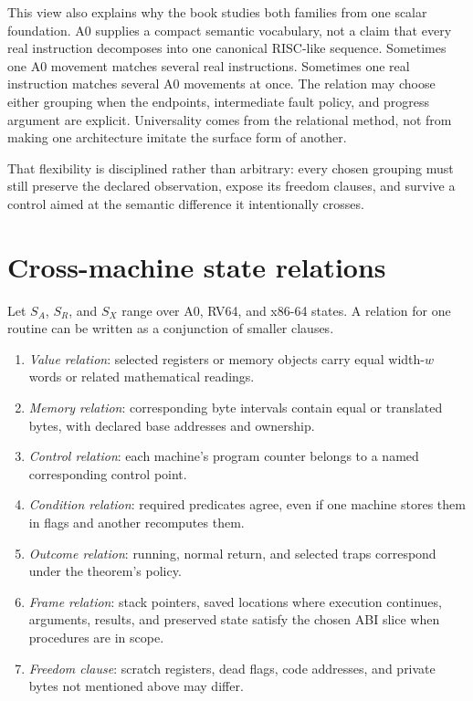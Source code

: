 This view also explains why the book studies both families from one scalar
foundation. A0 supplies a compact semantic vocabulary, not a claim that every
real instruction decomposes into one canonical RISC-like sequence. Sometimes
one A0 movement matches several real instructions. Sometimes one real
instruction matches several A0 movements at once. The relation may choose
either grouping when the endpoints, intermediate fault policy, and progress
argument are explicit. Universality comes from the relational method, not from
making one architecture imitate the surface form of another.

That flexibility is disciplined rather than arbitrary: every chosen grouping
must still preserve the declared observation, expose its freedom clauses, and
survive a control aimed at the semantic difference it intentionally crosses.

\section{Cross-machine state relations}

Let \(S_A\), \(S_R\), and \(S_X\) range over A0, RV64, and x86-64 states. A
relation for one routine can be written as a conjunction of smaller clauses.

\begin{enumerate}
\item \emph{Value relation}: selected registers or memory objects carry equal
width-\(w\) words or related mathematical readings.
\item \emph{Memory relation}: corresponding byte intervals contain equal or
translated bytes, with declared base addresses and ownership.
\item \emph{Control relation}: each machine's program counter belongs to a
named corresponding control point.
\item \emph{Condition relation}: required predicates agree, even if one
machine stores them in flags and another recomputes them.
\item \emph{Outcome relation}: running, normal return, and selected traps
correspond under the theorem's policy.
\item \emph{Frame relation}: stack pointers, saved locations where execution
continues, arguments,
results, and preserved state satisfy the chosen ABI slice when procedures are
in scope.
\item \emph{Freedom clause}: scratch registers, dead flags, code addresses,
and private bytes not mentioned above may differ.
\end{enumerate}

